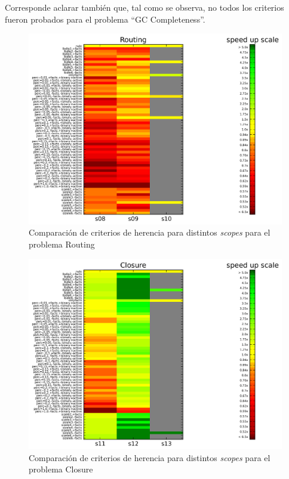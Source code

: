 Corresponde aclarar también que, tal como se observa, no todos los criterios
fueron probados para el problema ``GC Completeness''. 

\begin{figure}
	\includegraphics[width=\textwidth]{resultados/losp_heat.png}
	\caption{Comparación de criterios de herencia para distintos \emph{scopes} para el problema Routing}
	\label{res:learnscopespamela}
\end{figure}

\begin{figure}
	\includegraphics[width=\textwidth]{resultados/losk_heat.png}
	\caption{Comparación de criterios de herencia para distintos \emph{scopes} para el problema Closure}
	\label{res:learnscopesclosure}
\end{figure}


